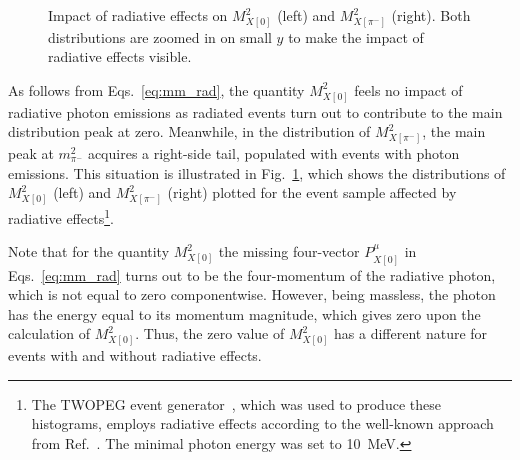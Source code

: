 \begin{figure}[htp]
\begin{center}
\caption{\small Impact of radiative effects on $M_{X[0]}^{2}$ (left) and $M_{X[\pi^{-}]}^{2}$ (right). Both distributions are zoomed in on small $y$ to make the impact of radiative effects visible.} \label{fig:mm_rad}
\end{center}
\end{figure}

As follows from Eqs.~\eqref{eq:mm_rad}, the quantity $M_{X[0]}^{2}$ feels no impact of radiative photon emissions as radiated events turn out to contribute to the main distribution peak at zero. Meanwhile, in the distribution of $M_{X[\pi^{-}]}^{2}$, the main peak at $m_{\pi^{-}}^{2}$ acquires a right-side tail, populated with events with photon emissions. This situation is illustrated in Fig.~\ref{fig:mm_rad}, which shows the distributions of $M_{X[0]}^{2}$ (left) and $M_{X[\pi^{-}]}^{2}$ (right) plotted for the event sample affected by radiative effects\footnote[3]{The TWOPEG event generator~\cite{twopeg}, which was used to produce these histograms, employs radiative effects according to the well-known approach from Ref.~\cite{Mo:1968cg}. The minimal photon energy was set to 10~MeV.}.

Note that for the quantity $M_{X[0]}^{2}$ the missing four-vector $P_{X[0]}^{\mu}$ in Eqs.~\eqref{eq:mm_rad} turns out to be the four-momentum of the radiative photon, which is not equal to zero componentwise. However, being massless, the photon has the energy equal to its momentum magnitude, which gives zero upon the calculation of $M_{X[0]}^{2}$. Thus, the zero value of $M_{X[0]}^{2}$ has a different nature for events with and without radiative effects.


